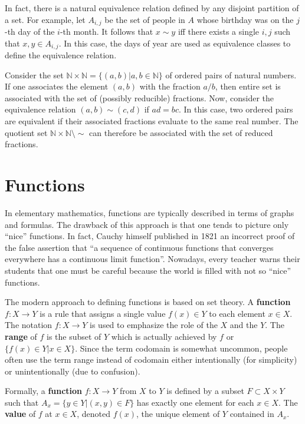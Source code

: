 In fact, there is a natural equivalence relation defined by any disjoint partition of a set.
For example, let $A_{i,j}$ be the set of people in $A$ whose birthday was on the $j$-th day of the $i$-th month.
It follows that $x\sim y$ iff there exists a single $i,j$ such that $x,y\in A_{i,j}$.
In this case, the days of year are used as equivalence classes to define the equivalence relation.

\begin{example}
Consider the set $\mathbb{N} \times \mathbb{N} = \{ (a,b) | a,b\in\mathbb{N} \}$ of ordered pairs of natural numbers.
If one associates the element $(a,b)$ with the fraction $a/b$, then entire set is associated with the set of (possibly reducible) fractions.
Now, consider the equivalence relation $(a,b) \sim (c,d)$ if $ad=bc$.
In this case, two ordered pairs are equivalent if their associated fractions evaluate to the same real number.
The quotient set $\mathbb{N} \times \mathbb{N} \setminus \!\sim$ can therefore be associated with the set of reduced fractions.
\end{example}


\section{Functions}

In elementary mathematics, functions are typically described in terms of graphs and formulas.
The drawback of this approach is that one tends to picture only ``nice'' functions.
In fact, Cauchy himself published in 1821 an incorrect proof of the false assertion that ``a sequence of continuous functions that converges everywhere has a continuous limit function''.
Nowadays, every teacher warns their students that one must be careful because the world is filled with not so ``nice'' functions.

The modern approach to defining functions is based on set theory.
A \textbf{function} $f: X\rightarrow Y$ is a rule that assigns a single value $f(x)\in Y$ to each element $x\in X$.
The notation $f: X \rightarrow Y$ is used to emphasize the role of the  $X$ and the  $Y$.
The \textbf{range} of $f$ is the subset of $Y$ which is actually achieved by $f$ or  $\{f(x) \in Y | x\in X \}$.
Since the term codomain is somewhat uncommon, people often use the term range instead of codomain either intentionally (for simplicity) or unintentionally (due to confusion).
\begin{definition}
Formally, a \textbf{function} $f: X \rightarrow Y$ from $X$ to $Y$ is defined by a subset $F \subset X \times Y$ such that $A_x = \{ y\in Y | (x,y)\in F \}$ has exactly one element for each $x\in X$.
The \textbf{value} of $f$ at $x\in X$, denoted $f(x)$, the unique element of $Y$ contained in $A_x$.
\end{definition}

